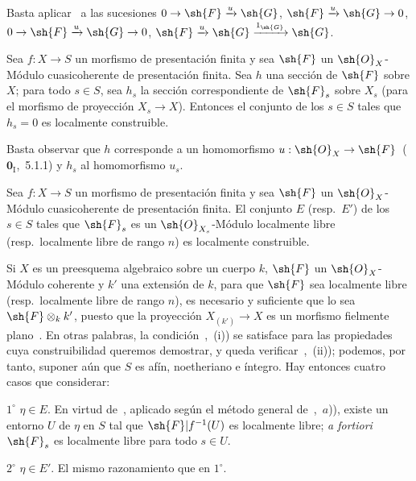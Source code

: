 Basta aplicar~ a las sucesiones $0\to\sh{F}\xrightarrow{u}\sh{G}$, $\sh{F}\xrightarrow{u}\sh{G}\to 0$, $0\to\sh{F}\xrightarrow{u}\sh{G}\to 0$, $\sh{F}\xrightarrow{u}\sh{G}\xrightarrow{1_\sh{G}}\sh{G}$.

\begin{corollary}[9.4.6]
\label{IV.9.4.6}
Sea $f:X\to S$ un morfismo de presentación finita y sea $\sh{F}$ un $\sh{O}_X$-Módulo cuasicoherente de presentación finita.
Sea $h$ una sección de $\sh{F}$ sobre $X$; para todo $s\in S$, sea $h_s$ la sección correspondiente de $\sh{F}_s$ sobre $X_s$ \textnormal{(}para el morfismo de proyección $X_s\to X$\textnormal{)}.
Entonces el conjunto de los $s\in S$ tales que $h_s=0$ es localmente construible.
\end{corollary}

Basta observar que $h$ corresponde a un homomorfismo $u:\sh{O}_X\to\sh{F}$~($\mathbf{0}_{\mathrm{I}}$,~5.1.1) y $h_s$ al homomorfismo $u_s$.

\begin{proposition}[9.4.7]
\label{IV.9.4.7}
Sea $f:X\to S$ un morfismo de presentación finita y sea $\sh{F}$ un $\sh{O}_X$-Módulo cuasicoherente de presentación finita.
El conjunto $E$ \textnormal{(resp.}\ $E'$\textnormal{)} de los $s\in S$ tales que $\sh{F}_s$ es un $\sh{O}_{X_s}$-Módulo localmente libre \textnormal{(resp.}\ localmente libre de rango $n$\textnormal{)} es localmente construible.
\end{proposition}

Si $X$ es un preesquema algebraico sobre un cuerpo $k$, $\sh{F}$ un $\sh{O}_X$-Módulo coherente y $k'$ una extensión de $k$, para que $\sh{F}$ sea localmente libre (resp.\ localmente libre de rango $n$), es necesario y suficiente que lo sea $\sh{F}\otimes_k k'$, puesto que la proyección $X_{(k')}\to X$ es un morfismo fielmente plano~.
En otras palabras, la condición~,~(i)) se satisface para las propiedades cuya construibilidad queremos demostrar, y queda verificar~,~(ii)); podemos, por tanto, suponer aún que $S$ es afín, noetheriano e íntegro.
Hay entonces cuatro casos que considerar:

$1^\circ$ $\eta\in E$.
En virtud de~, aplicado según el método general de~,~$a$)), existe un entorno $U$ de $\eta$ en $S$ tal que $\sh{F}|f^{-1}(U)$ es localmente libre; \emph{a fortiori} $\sh{F}_s$ es localmente libre para todo $s\in U$.

$2^\circ$ $\eta\in E'$.
El mismo razonamiento que en $1^\circ$.

